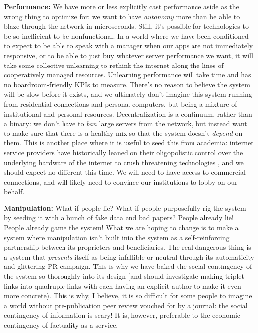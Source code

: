 \textbf{Performance:} We have more or less explicitly cast performance
aside as the wrong thing to optimize for: we want to have
\emph{autonomy} more than be able to blaze through the network in
microseconds. Still, it's possible for technologies to be so inefficient
to be nonfunctional. In a world where we have been conditioned to expect
to be able to speak with a manager when our apps are not immediately
responsive, or to be able to just buy whatever server performance we
want, it will take some collective unlearning to rethink the internet
along the lines of cooperatively managed resources. Unlearning
performance will take time and has no boardroom-friendly KPIs to
measure. There's no reason to believe the system will be slow before it
exists, and we ultimately don't imagine this system running from
residential connections and personal computers, but being a mixture of
institutional and personal resources. Decentralization is a continuum,
rather than a binary: we don't have to \emph{ban} large servers from the
network, but instead want to make sure that there is a healthy mix so
that the system doesn't \emph{depend} on them. This is another place
where it is useful to seed this from academia: internet service
providers have historically leaned on their oligopolistic control over
the underlying hardware of the internet to crush threatening
technologies \citep{vandersarComcastThrottlesBitTorrent2007} , and
we should expect no different this time. We will need to have access to
commercial connections, and will likely need to convince our
institutions to lobby on our behalf.

\textbf{Manipulation:} What if people lie? What if people purposefully
rig the system by seeding it with a bunch of fake data and bad papers?
People already lie! People already game the system! What we are hoping
to change is to make a system where manipulation isn't built into the
system as a self-reinforcing partnership between its proprieters and
beneficiaries. The real dangerous thing is a system that \emph{presents}
itself as being infallible or neutral through its automaticity and
glittering PR campaign. This is why we have baked the social contingency
of the system so thoroughly into its design (and should investigate
making triplet links into quadruple links with each having an explicit
author to make it even more concrete). This is why, I believe, it is so
difficult for some people to imagine a world without pre-publication
peer review vouched for by a journal: the social contingency of
information is scary! It is, however, preferable to the economic
contingency of factuality-as-a-service.


